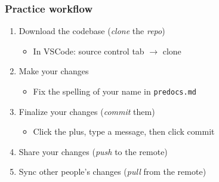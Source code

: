 \documentclass{ali-presentation}
\begin{document}
\begin{frame}
    \frametitle{Practice workflow}

    \begin{enumerate}
        \item Download the codebase (\textit{clone} the \textit{repo})
        \begin{itemize}
            \item In VSCode: source control tab $\rightarrow$ clone
        \end{itemize}
        \item Make your changes
        \begin{itemize}
            \item Fix the spelling of your name in \texttt{predocs.md}
        \end{itemize}
        \item Finalize your changes (\textit{commit} them)
        \begin{itemize}
            \item Click the plus, type a message, then click commit
        \end{itemize}
        \item Share your changes (\textit{push} to the remote)
        \item Sync other people's changes (\textit{pull} from the remote)
    \end{enumerate}
\end{frame}
\end{document}
